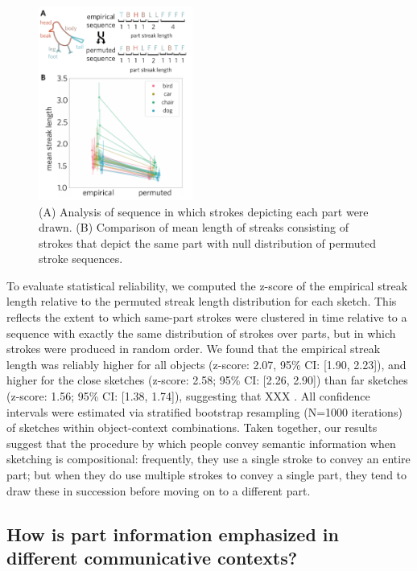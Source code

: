 \documentclass[10pt,letterpaper]{article}
\newcommand{\jefan}[1]{{\color{blue}{[jefan: #1]}}}
\begin{document}
\begin{figure}[ht]
\centering
\includegraphics[width=0.45\textwidth]{figures/6_part_sequence.pdf}
\caption{(A) Analysis of sequence in which strokes depicting each part were drawn. (B) Comparison of mean length of streaks consisting of strokes that depict the same part with null distribution of permuted stroke sequences.}
\label{stroke_sequence_fig}
\end{figure}


To evaluate statistical reliability, we computed the z-score of the empirical streak length relative to the permuted streak length distribution for each sketch. 
This reflects the extent to which same-part strokes were clustered in time relative to a sequence with exactly the same distribution of strokes over parts, but in which strokes were produced in random order. 
We found that the empirical streak length was reliably higher for all objects (z-score: 2.07, 95\% CI: [1.90, 2.23]), and higher for the close sketches (z-score: 2.58; 95\% CI: [2.26, 2.90]) than far sketches (z-score: 1.56; 95\% CI: [1.38, 1.74]), suggesting that XXX \jefan{need to provide interpretation here for close vs. far result}.  
All confidence intervals were estimated via stratified bootstrap resampling (N=1000 iterations) of sketches within object-context combinations.
Taken together, our results suggest that the procedure by which people convey semantic information when sketching is compositional: frequently, they use a single stroke to convey an entire part; but when they do use multiple strokes to convey a single part, they tend to draw these in succession before moving on to a different part. 

\subsection{How is part information emphasized in different communicative contexts?}
\end{document}
